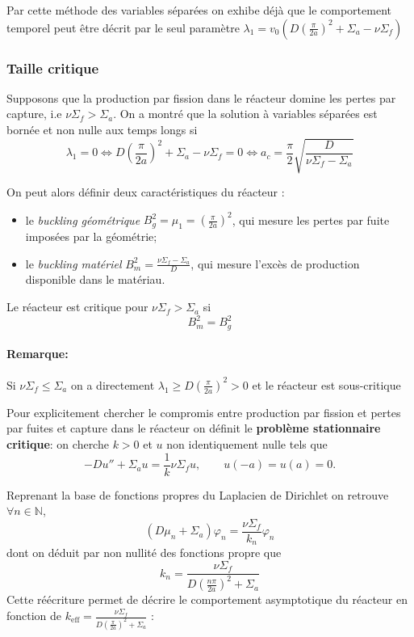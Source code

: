 \documentclass{article}
\newcommand{\keff}{k_{\mathrm{eff}}}
\begin{document}
Par cette méthode des variables séparées on exhibe déjà que le comportement temporel peut être décrit par le seul paramètre \(\lambda_1 = v_0(D\left(\frac{\pi}{2a}\right)^2 +\Sigma_a -\nu\Sigma_f)\)

\subsubsection{Taille critique}
Supposons que la production par fission dans le réacteur domine les pertes par capture, i.e $\nu\Sigma_f > \Sigma_a$.
On a montré que la solution à variables séparées est bornée et non nulle aux temps longs si 
\[
\lambda_1 = 0 \iff D\left(\frac{\pi}{2a}\right)^2 +\Sigma_a -\nu\Sigma_f = 0 \iff a_c = \frac{\pi}{2}\sqrt{\frac{D}{\nu\Sigma_f - \Sigma_a}}
\]

On peut alors définir deux caractéristiques du réacteur :
\begin{itemize}
    \item le \emph{buckling géométrique} $B_g^2=\mu_1=\left(\frac{\pi}{2a}\right)^2$, qui mesure les pertes par fuite imposées par la géométrie;
    \item le \emph{buckling matériel} $B_m^2=\frac{\nu\Sigma_f-\Sigma_a}{D}$, qui mesure l'excès de production disponible dans le matériau.
\end{itemize}
Le réacteur est critique pour $\nu\Sigma_f > \Sigma_a$ si
\begin{equation}
    B_m^2 = B_g^2
\end{equation}

\paragraph{Remarque:} Si  $\nu\Sigma_f \le \Sigma_a$ on a directement $\lambda_1 \ge D\left(\frac{\pi}{2a}\right)^2 >0$ et le réacteur est sous-critique

\bigskip
\bigskip

Pour explicitement chercher le compromis entre production par fission et pertes par fuites et capture dans le réacteur on définit le \textbf{problème stationnaire critique}: on cherche $k>0$ et $u$ non identiquement nulle tels que 
\begin{equation}
    -Du'' +\Sigma_au = \frac{1}{k}\nu\Sigma_fu, \qquad  u(-a)=u(a)=0.
\end{equation}

Reprenant la base de fonctions propres du Laplacien de Dirichlet on retrouve $\forall n \in \mathbb{N}$,
\[
(D\mu_n +\Sigma_a)\varphi_n = \frac{\nu\Sigma_f}{k_n}\varphi_n
\]
dont on déduit par non nullité des fonctions propre que 
\[k_n = \frac{\nu\Sigma_f}{D\left(\frac{n\pi}{2a}\right)^2+\Sigma_a}\]
Cette réécriture permet de décrire le comportement asymptotique du réacteur en fonction de $\keff = \frac{\nu\Sigma_f}{D\left(\frac{\pi}{2a}\right)^2+\Sigma_a}$ :
\end{document}
